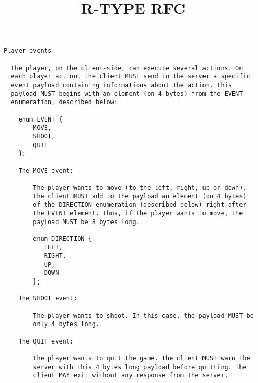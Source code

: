 \documentclass[12pt, letterpaper]{article}\title{R-TYPE RFC}
\begin{document}
\begin{verbatim}
Player events

  The player, on the client-side, can execute several actions. On
  each player action, the client MUST send to the server a specific
  event payload containing informations about the action. This
  payload MUST begins with an element (on 4 bytes) from the EVENT
  enumeration, described below:

    enum EVENT {
        MOVE,
        SHOOT,
        QUIT
    };

    The MOVE event:

        The player wants to move (to the left, right, up or down).
        The client MUST add to the payload an element (on 4 bytes)
        of the DIRECTION enumeration (described below) right after
        the EVENT element. Thus, if the player wants to move, the
        payload MUST be 8 bytes long.

        enum DIRECTION {
           LEFT,
           RIGHT,
           UP,
           DOWN
        };

    The SHOOT event:

        The player wants to shoot. In this case, the payload MUST be
        only 4 bytes long.

    The QUIT event:

        The player wants to quit the game. The client MUST warn the
        server with this 4 bytes long payload before quitting. The
        client MAY exit without any response from the server.
\end{verbatim}
\end{document}
